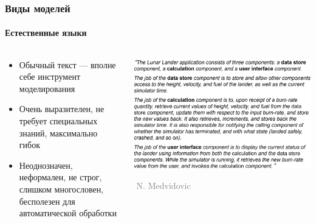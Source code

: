 \documentclass[xetex,mathserif,serif]{beamer}
\newcommand{\attribution}[1] {
	\vspace{-5mm}\begin{flushright}\begin{scriptsize}\textcolor{gray}{\textcopyright\, #1}\end{scriptsize}\end{flushright}
}
\begin{document}
	\begin{frame}
		\frametitle{Виды моделей}
		\framesubtitle{Естественные языки}
		\begin{columns}
			\begin{column}{0.5\textwidth}
				\begin{itemize}
					\item Обычный текст --- вполне себе инструмент моделирования
					\item Очень выразителен, не требует специальных знаний, максимально гибок
					\item Неоднозначен, неформален, не строг, слишком многословен, бесполезен для автоматической обработки
				\end{itemize}
			\end{column}
			\begin{column}{0.5\textwidth}
				\begin{center}
					\includegraphics[width=\textwidth]{naturalLanguage.png}
					\attribution{N. Medvidovic}
				\end{center}
			\end{column}
		\end{columns}
	\end{frame}
\end{document}
